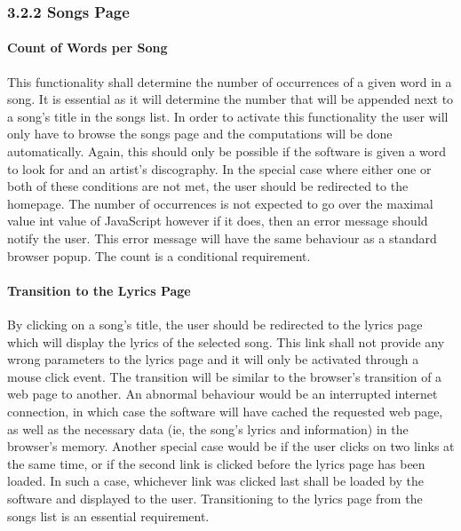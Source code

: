 \documentclass[]{article}
\begin{document}
\subsubsection{3.2.2 Songs Page}\label{songs-page}

\paragraph{Count of Words per Song}\label{count-of-words-per-song}

This functionality shall determine the number of occurrences of a given
word in a song. It is essential as it will determine the number that
will be appended next to a song's title in the songs list. In order to
activate this functionality the user will only have to browse the songs
page and the computations will be done automatically. Again, this should
only be possible if the software is given a word to look for and an
artist's discography. In the special case where either one or both of
these conditions are not met, the user should be redirected to the
homepage. The number of occurrences is not expected to go over the
maximal value int value of JavaScript however if it does, then an error
message should notify the user. This error message will have the same
behaviour as a standard browser popup. The count is a conditional
requirement.

\paragraph{Transition to the Lyrics
Page}\label{transition-to-the-lyrics-page}

By clicking on a song's title, the user should be redirected to the
lyrics page which will display the lyrics of the selected song. This
link shall not provide any wrong parameters to the lyrics page and it
will only be activated through a mouse click event. The transition will
be similar to the browser's transition of a web page to another. An
abnormal behaviour would be an interrupted internet connection, in which
case the software will have cached the requested web page, as well as
the necessary data (ie, the song's lyrics and information) in the
browser's memory. Another special case would be if the user clicks on
two links at the same time, or if the second link is clicked before the
lyrics page has been loaded. In such a case, whichever link was clicked
last shall be loaded by the software and displayed to the user.
Transitioning to the lyrics page from the songs list is an essential
requirement.
\end{document}
